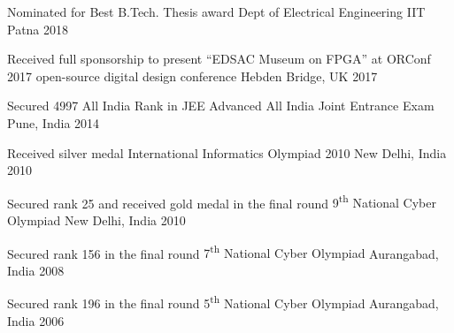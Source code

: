 
\begin{cvhonors}

\cvhonor
	{Nominated for Best B.Tech. Thesis award} %
	{Dept of Electrical Engineering} %
	{IIT Patna} %
	{2018} %

\cvhonor
	{Received full sponsorship to present ``EDSAC Museum on FPGA'' at ORConf 2017 open-source digital design conference} %
	{} %
	{Hebden Bridge, UK} %
	{2017} %

\cvhonor
	{Secured 4997 All India Rank in JEE Advanced} %
	{All India Joint Entrance Exam} %
	{Pune, India} %
	{2014} %

\cvhonor
	{Received silver medal} %
	{International Informatics Olympiad 2010} %
	{New Delhi, India} %
	{2010} %

\cvhonor
	{Secured rank 25 and received gold medal in the final round} %
	{9\textsuperscript{th} National Cyber Olympiad} %
	{New Delhi, India} %
	{2010} %

\cvhonor
	{Secured rank 156 in the final round} %
	{7\textsuperscript{th} National Cyber Olympiad} %
	{Aurangabad, India} %
	{2008} %

\cvhonor
	{Secured rank 196 in the final round} %
	{5\textsuperscript{th} National Cyber Olympiad} %
	{Aurangabad, India} %
	{2006} %

\end{cvhonors}
